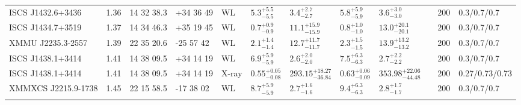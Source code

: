 \begin{landscape}
\begin{center}
{\begin{longtable}{llllllllllll}
ISCS J1432.6+3436 & 1.36 & 14 32 38.3 & +34 36 49 & WL & ${5.3}^{+5.5}_{-5.5}$ & ${3.4}^{+2.7}_{-2.7}$ & ${5.8}^{+5.9}_{-5.9}$ & ${3.6}^{+3.0}_{-3.0}$ & \citet{SE14.1} & 200 & 0.3/0.7/0.7 \\
ISCS J1434.7+3519 & 1.37 & 14 34 46.3 & +35 19 45 & WL & ${0.7}^{+0.9}_{-0.9}$ & ${11.1}^{+15.9}_{-15.9}$ & ${0.8}^{+1.0}_{-1.0}$ & ${13.0}^{+20.1}_{-20.1}$ & \citet{SE14.1} & 200 & 0.3/0.7/0.7 \\
XMMU J2235.3-2557 & 1.39 & 22 35 20.6 & -25 57 42 & WL & ${2.1}^{+1.4}_{-1.4}$ & ${12.7}^{+11.7}_{-11.7}$ & ${2.3}^{+1.5}_{-1.5}$ & ${13.9}^{+13.2}_{-13.2}$ & \citet{SE14.1} & 200 & 0.3/0.7/0.7 \\
ISCS J1438.1+3414 & 1.41 & 14 38 09.5 & +34 14 19 & WL & ${6.9}^{+5.9}_{-5.9}$ & ${2.6}^{+2.0}_{-2.0}$ & ${7.5}^{+6.3}_{-6.3}$ & ${2.7}^{+2.2}_{-2.2}$ & \citet{SE14.1} & 200 & 0.3/0.7/0.7 \\
ISCS J1438.1+3414 & 1.41 & 14 38 09.5 & +34 14 19 & X-ray & ${0.55}^{+0.05}_{-0.08}$ & ${293.15}^{+18.27}_{-36.84}$ & ${0.63}^{+0.06}_{-0.09}$ & ${353.98}^{+22.06}_{-44.48}$ & \citet{BA14.1} & 200 & 0.27/0.73/0.73 \\
XMMXCS J2215.9-1738 & 1.45 & 22 15 58.5 & -17 38 02 & WL & ${8.7}^{+5.9}_{-5.9}$ & ${2.7}^{+1.6}_{-1.6}$ & ${9.4}^{+6.3}_{-6.3}$ & ${2.8}^{+1.7}_{-1.7}$ & \citet{SE14.1} & 200 & 0.3/0.7/0.7 \\
\label{tbl-1}
\end{longtable} }
\end{center}
\end{landscape}

